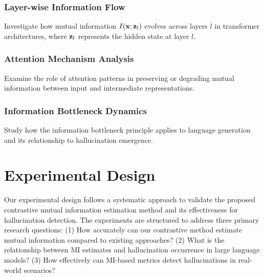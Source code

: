 \subsubsection{Layer-wise Information Flow}
Investigate how mutual information $I({\mathbf{x}}; {\mathbf{z}}_l)$ evolves across layers $l$ in transformer architectures, where ${\mathbf{z}}_l$ represents the hidden state at layer $l$.

\subsubsection{Attention Mechanism Analysis}
Examine the role of attention patterns in preserving or degrading mutual information between input and intermediate representations.

\subsubsection{Information Bottleneck Dynamics}
Study how the information bottleneck principle applies to language generation and its relationship to hallucination emergence.

\section{Experimental Design}
\label{sec:experiments}

Our experimental design follows a systematic approach to validate the proposed contrastive mutual information estimation method and its effectiveness for hallucination detection. The experiments are structured to address three primary research questions: (1) How accurately can our contrastive method estimate mutual information compared to existing approaches? (2) What is the relationship between MI estimates and hallucination occurrence in large language models? (3) How effectively can MI-based metrics detect hallucinations in real-world scenarios?

